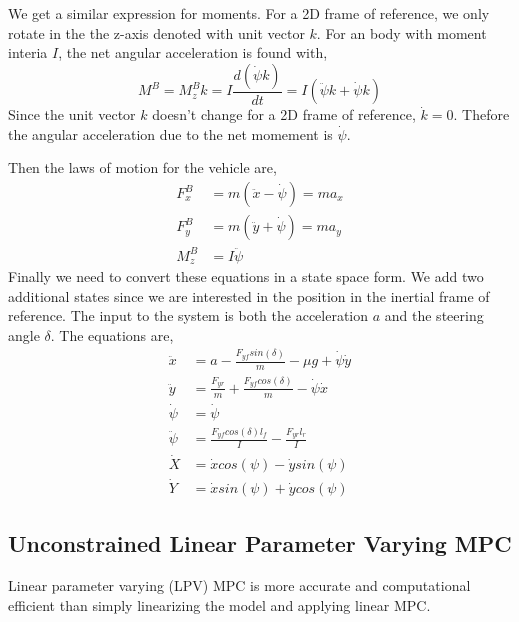\documentclass{article}
\begin{document}
\begin{tcolorbox}[title={Newton's laws in a non-inertial frame for reference.}]
We get a similar expression for moments. For a 2D frame of reference, we only rotate in the the z-axis denoted with
unit vector $k$. For an body with moment interia $I$, the net angular acceleration is found with,
\begin{equation}
    M^B = M_z^Bk = I\frac{d(\dot{\psi}k)}{dt} =  I\left(\ddot{\psi}k + \dot{\psi}k\right)
\end{equation}
Since the unit vector $k$ doesn't change for a 2D frame of reference, $\dot{k} = 0$. Thefore the angular acceleration
due to the net momement is $\dot{\psi}$.

\end{tcolorbox}

Then the laws of motion for the vehicle are,
\begin{align}
    F^B_x &= m(\ddot{x} - \dot{\psi}) = ma_x \\
    F^B_y &= m(\ddot{y} + \dot{\psi}) = ma_y \\
    M^B_z &= I\ddot{\psi}
\end{align}
Finally we need to convert these equations in a state space form. We add two additional states since we are interested
in the position in the inertial frame of reference. The input to the system is both the acceleration $a$ and the
steering angle $\delta$. The equations are,
\begin{align}
    \ddot{x} &= a - \frac{F_{yf}sin(\delta)}{m} - \mu g + \dot{\psi}\dot{y} \\
    \ddot{y} &=  \frac{F_{yr}}{m} + \frac{F_{yf}cos(\delta)}{m} - \dot{\psi}\dot{x} \\
    \dot{\psi} &=  \dot{\psi} \\
    \ddot{\psi} &=  \frac{F_{yf}cos(\delta)l_f}{I} - \frac{F_{yr}l_r}{I} \\
    \dot{X} &= \dot{x}cos(\psi) - \dot{y}sin(\psi) \\
    \dot{Y} &= \dot{x}sin(\psi) + \dot{y}cos(\psi)
\end{align}

\subsection{Unconstrained Linear Parameter Varying MPC}

Linear parameter varying (LPV) MPC is more accurate and computational efficient than simply linearizing the model and
applying linear MPC.
\end{document}
